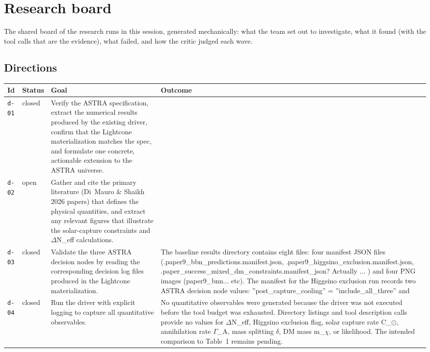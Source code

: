 \documentclass[11pt,a4paper]{article}
\begin{document}
\section{Research board}
\label{app:board}
The shared board of the research runs in this session, generated mechanically: what the team set out to investigate, what it found (with the tool calls that are the evidence), what failed, and how the critic judged each wave.
\subsection{Directions}
\begin{longtable}{@{}p{}p{}p{}p{}@{}}
\toprule Id & Status & Goal & Outcome \\ \midrule \endhead
\texttt{d-01} & closed & Verify the ASTRA specification, extract the numerical results produced by the existing driver, confirm that the Lightcone materialization matches the spec, and formulate one concrete, actionable extension to the ASTRA universe. &  \\
\texttt{d-02} & open & Gather and cite the primary literature (Di~Mauro \& Shaikh 2026 papers) that defines the physical quantities, and extract any relevant figures that illustrate the solar-capture constraints and $\Delta$N\_eff calculations. &  \\
\texttt{d-03} & closed & Validate the three ASTRA decision nodes by reading the corresponding decision log files produced in the Lightcone materialization. & The baseline results directory contains eight files: four manifest JSON files (.paper9\_bbn\_predictions.manifest.json, .paper9\_higgsino\_exclusion.manifest.json, .paper\_success\_mixed\_dm\_constraints.manifest\_json? Actually ... ) and four PNG images (paper9\_bnn... etc). The manifest for the Higgsino exclusion run records two ASTRA decision node values: ''post\_capture\_cooling'' = ''include\_all\_three'' and  \\
\texttt{d-04} & closed & Run the driver with explicit logging to capture all quantitative observables. & No quantitative observables were generated because the driver was not executed before the tool budget was exhausted. Directory listings and tool description calls provide no values for $\Delta$N\_eff, Higgsino exclusion flag, solar capture rate C\_$\odot$, annihilation rate $\Gamma$\_A, mass splitting $\delta$, DM mass m\_$\chi$, or likelihood. The intended comparison to Table~1 remains pending. \\

\end{longtable}
\end{document}
